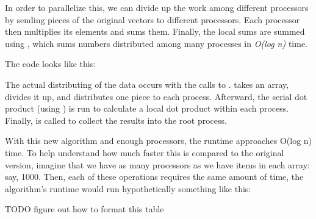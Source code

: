   In order to parallelize this, we can divide up the work among different processors by sending pieces of the original vectors to different processors. Each processor then multiplies its elements and sums them. Finally, the local sums are summed using , which sums numbers distributed among many processes in \emph{O(log n)} time.

  The code looks like this:

  

  The actual distributing of the data occurs with the calls to .  takes an array, divides it up, and distributes one piece to each process. Afterward, the serial dot product (using ) is run to calculate a local dot product within each process. Finally,  is called to collect the results into the root process.

  With this new algorithm and enough processors, the runtime approaches O(log n) time. To help understand how much faster this is compared to the original version, imagine that we have as many processors as we have items in each array: say, 1000. Then, each of these operations requires the same amount of time, the algorithm's runtime would run hypothetically something like this:

  TODO figure out how to format this table








